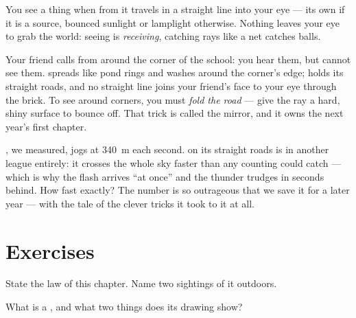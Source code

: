\begin{proposition}\label{prop:g4:light-straight-lines:seeing}
You see a thing when  from it travels in a straight line into
your eye --- its own  if it is a source, bounced sunlight or
lamplight otherwise. Nothing leaves your eye to grab the world:
seeing is \emph{receiving}, catching rays like a net catches balls.
\end{proposition}

\begin{example}\label{ex:g4:light-straight-lines:corner}
Your friend calls from around the corner of the school: you hear
them, but cannot see them.  spreads like pond rings and washes
around the corner's edge;  holds its straight roads, and no
straight line joins your friend's face to your eye through the
brick. To see around corners, you must \emph{fold the road} ---
give the ray a hard, shiny surface to bounce off. That trick is
called the mirror, and it owns the next year's first  chapter.
\end{example}

\begin{remark}\label{rem:g4:light-straight-lines:speed}
, we measured, jogs at \qty{340}{m} each second.  on its
straight roads is in another league entirely: it crosses the whole
sky faster than any counting could catch --- which is why the flash
arrives ``at once'' and the thunder trudges in seconds behind. How
fast exactly? The number is so outrageous that we save it for a
later year --- with the tale of the clever tricks it took to
 it at all.
\end{remark}

\section{Exercises}

\begin{exercise}[$\star$]\label{exo:g4:light-straight-lines:1}
State the law of this chapter. Name two sightings of it outdoors.
\end{exercise}

\begin{exercise}[$\star$]\label{exo:g4:light-straight-lines:2}
What is a , and what two things does its drawing show?
\end{exercise}

